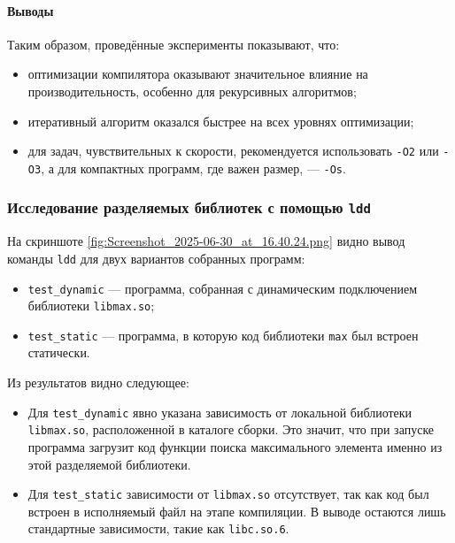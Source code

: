 \paragraph*{Выводы}

Таким образом, проведённые эксперименты показывают, что:
\begin{itemize}
    \item оптимизации компилятора оказывают значительное влияние на производительность, особенно для рекурсивных алгоритмов;
    \item итеративный алгоритм оказался быстрее на всех уровнях оптимизации;
    \item для задач, чувствительных к скорости, рекомендуется использовать \texttt{-O2} или \texttt{-O3}, а для компактных программ, где важен размер, — \texttt{-Os}.
\end{itemize}

\subsubsection{Исследование разделяемых библиотек с помощью \texttt{ldd}}

На скриншоте \ref{fig:Screenshot_2025-06-30_at_16.40.24.png} видно вывод команды \texttt{ldd} для двух вариантов собранных программ:


\begin{itemize}
    \item \texttt{test\_dynamic} — программа, собранная с динамическим подключением библиотеки \texttt{libmax.so};
    \item \texttt{test\_static} — программа, в которую код библиотеки \texttt{max} был встроен статически.
\end{itemize}

Из результатов видно следующее:
\begin{itemize}
    \item Для \texttt{test\_dynamic} явно указана зависимость от локальной библиотеки \texttt{libmax.so}, расположенной в каталоге сборки. Это значит, что при запуске программа загрузит код функции поиска максимального элемента именно из этой разделяемой библиотеки.
    \item Для \texttt{test\_static} зависимости от \texttt{libmax.so} отсутствует, так как код был встроен в исполняемый файл на этапе компиляции. В выводе остаются лишь стандартные зависимости, такие как \texttt{libc.so.6}.
\end{itemize}

